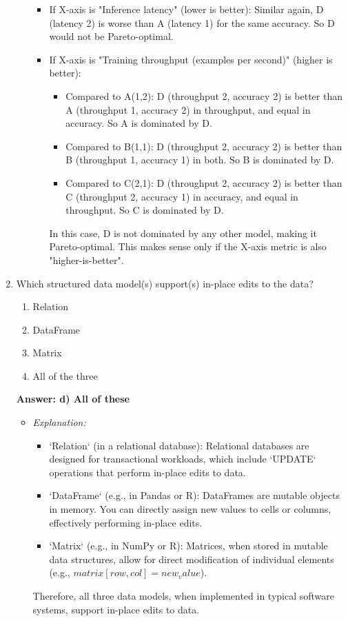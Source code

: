 \documentclass{article}
\begin{document}
\begin{enumerate}[label=\textbf{Question \arabic*.}]
\begin{itemize}
\begin{itemize}
            \item If X-axis is "Inference latency" (lower is better): Similar again, D (latency 2) is worse than A (latency 1) for the same accuracy. So D would not be Pareto-optimal.
            \item If X-axis is "Training throughput (examples per second)" (higher is better):
                \begin{itemize}
                    \item Compared to A(1,2): D (throughput 2, accuracy 2) is better than A (throughput 1, accuracy 2) in throughput, and equal in accuracy. So A is dominated by D.
                    \item Compared to B(1,1): D (throughput 2, accuracy 2) is better than B (throughput 1, accuracy 1) in both. So B is dominated by D.
                    \item Compared to C(2,1): D (throughput 2, accuracy 2) is better than C (throughput 2, accuracy 1) in accuracy, and equal in throughput. So C is dominated by D.
                \end{itemize}
                In this case, D is not dominated by any other model, making it Pareto-optimal. This makes sense only if the X-axis metric is also "higher-is-better".
        \end{itemize}
    \end{itemize}

\item Which structured data model(s) support(s) in-place edits to the data?
    \begin{enumerate}[label=\alph*)]
        \item Relation
        \item DataFrame
        \item Matrix
        \item All of the three
    \end{enumerate}
    \textbf{Answer: d) All of these}
    \begin{itemize}
        \item \textit{Explanation:}
        \begin{itemize}
            \item `Relation` (in a relational database): Relational databases are designed for transactional workloads, which include `UPDATE` operations that perform in-place edits to data.
            \item `DataFrame` (e.g., in Pandas or R): DataFrames are mutable objects in memory. You can directly assign new values to cells or columns, effectively performing in-place edits.
            \item `Matrix` (e.g., in NumPy or R): Matrices, when stored in mutable data structures, allow for direct modification of individual elements (e.g., $matrix[row, col] = new_value$).
        \end{itemize}
        Therefore, all three data models, when implemented in typical software systems, support in-place edits to data.
    \end{itemize}


\end{enumerate}
\end{document}
